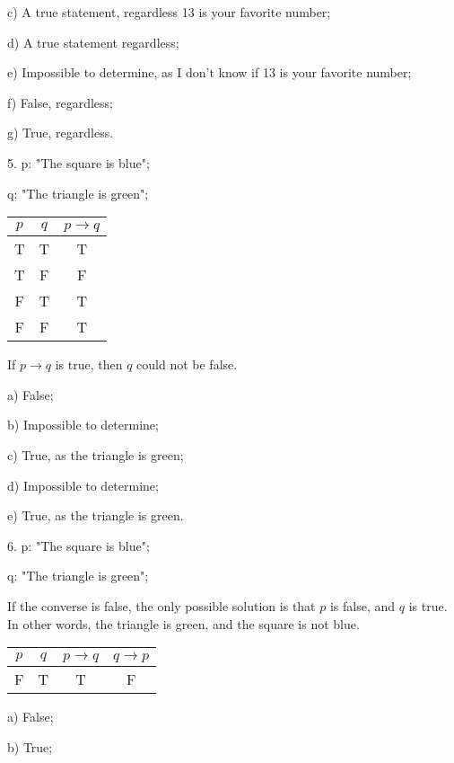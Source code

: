 \documentclass{article}
\begin{document}
  c) A true statement, regardless 13 is your favorite number;

  d) A true statement regardless;

  e) Impossible to determine, as I don't know if 13 is your favorite number;

  f) False, regardless;

  g) True, regardless.

  5. p: "The square is blue";

  q: "The triangle is green";
	
  {
  \setlength{\tabcolsep}{10pt} %
  \renewcommand{\arraystretch}{1.5} %
  \begin{tabular}{|c|c|c|}
    \hline
    $p$ & $q$ & $p \rightarrow q$ \\
    \hline
    T & T & T \\
    T & F & F \\
    F & T & T \\
    F & F & T \\
    \hline
  \end{tabular}
  }

  If $p \rightarrow q$ is true, then $q$ could not be false.

  a) False;

  b) Impossible to determine;

  c) True, as the triangle is green;

  d) Impossible to determine;

  e) True, as the triangle is green.

  6. p: "The square is blue";

  q: "The triangle is green";

  If the converse is false, the only possible solution is that $p$ is false, and $q$ is true. In other words, the triangle is green, and the square is not blue.
	
  {
  \setlength{\tabcolsep}{10pt} %
  \renewcommand{\arraystretch}{1.5} %
  \begin{tabular}{|c|c|c|c|}
    \hline
    $p$ & $q$ & $p \rightarrow q$ & $q \rightarrow p$ \\
    \hline
    F & T & T & F \\
    \hline
  \end{tabular}
  }

  a) False;

  b) True;
\end{document}

